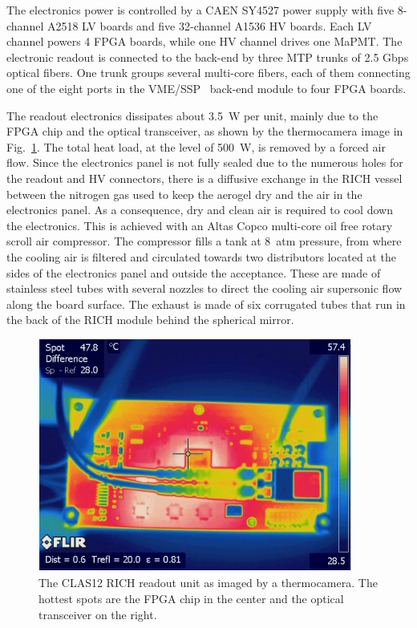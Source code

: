 \documentclass[5p,times,twocolumn]{elsarticle}
\begin{document}
The electronics power is controlled by a CAEN SY4527 power supply with five 8-channel A2518 LV boards and five
32-channel A1536 HV boards. Each LV channel powers 4 FPGA boards, while one HV channel drives one MaPMT. The
electronic readout is connected to the back-end by three MTP trunks of 2.5 Gbps optical fibers. One trunk groups
several multi-core fibers, each of them connecting one of the eight ports in the VME/SSP~\cite{daq-nim} back-end
module to four FPGA boards.

The readout electronics dissipates about 3.5~W per unit, mainly due to the FPGA chip and the optical transceiver, as
shown by the thermocamera image in Fig.~\ref{Fig:EleTile}. The total heat load, at the level of 500~W, is removed by
a forced air flow. Since the electronics panel is not fully sealed due to the numerous holes for the readout and HV
connectors, there is a diffusive exchange in the RICH vessel between the nitrogen gas used to keep the aerogel dry
and the air in the electronics panel. As a consequence, dry and clean air is required to cool down the electronics. This
is achieved with an Altas Copco multi-core oil free rotary scroll air compressor. The compressor fills a tank at 8~atm
pressure, from where the cooling air is filtered and circulated towards two distributors located at the sides of the
electronics panel and outside the acceptance. These are made of stainless steel tubes with several nozzles to direct
the cooling air supersonic flow along the board surface. The exhaust is made of six corrugated tubes that run in the
back of the RICH module behind the spherical mirror.

\begin{figure}[t]
\begin{center}
\includegraphics[width=0.90\columnwidth]{FPGA_heat.pdf}
\end{center}
\caption{The CLAS12 RICH readout unit as imaged by a thermocamera. The hottest spots are the FPGA chip in the
  center and the optical transceiver on the right.}
\label{Fig:EleTile}
\end{figure}
\end{document}
